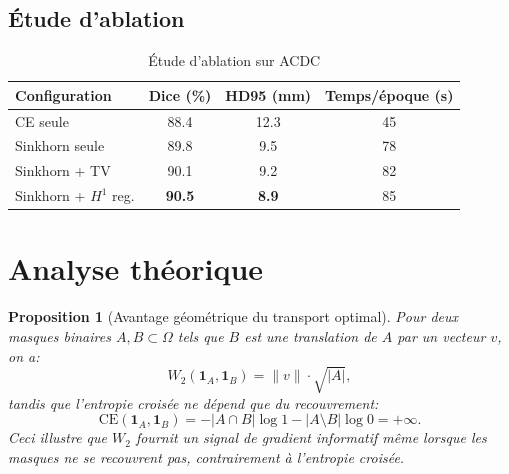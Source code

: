 \documentclass[11pt,a4paper]{article}
\newtheorem{proposition}[theorem]{Proposition}
\theoremstyle{definition}
\begin{document}
\subsection{\'Etude d'ablation}

\begin{table}[H]
\centering
\caption{\'Etude d'ablation sur ACDC}\label{tab:ablation}
\begin{tabular}{@{}lccc@{}}
\toprule
Configuration & Dice (\%) & HD95 (mm) & Temps/\'epoque (s) \\
\midrule
CE seule & 88.4 & 12.3 & 45 \\
Sinkhorn seule & 89.8 & 9.5 & 78 \\
Sinkhorn + TV & 90.1 & 9.2 & 82 \\
Sinkhorn + $H^1$ reg. & \textbf{90.5} & \textbf{8.9} & 85 \\
\bottomrule
\end{tabular}
\end{table}


\section{Analyse th\'eorique}

\begin{proposition}[Avantage g\'eom\'etrique du transport optimal]
Pour deux masques binaires $A, B \subset \Omega$ tels que $B$ est une
translation de $A$ par un vecteur $v$, on a:
\begin{equation}
  W_2(\mathbf{1}_A, \mathbf{1}_B) = \|v\| \cdot \sqrt{|A|},
\end{equation}
tandis que l'entropie crois\'ee ne d\'epend que du recouvrement:
\begin{equation}
  \text{CE}(\mathbf{1}_A, \mathbf{1}_B) = -|A \cap B| \log 1 -
    |A \setminus B| \log 0 = +\infty.
\end{equation}
Ceci illustre que $W_2$ fournit un signal de gradient informatif m\^eme
lorsque les masques ne se recouvrent pas, contrairement \`a l'entropie
crois\'ee.
\end{proposition}
\end{document}
